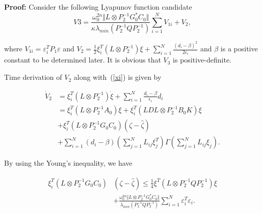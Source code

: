 \documentclass[english]{cccconf}
\begin{document}
\textbf{Proof:} Consider the following Lyapunov function candidate
\begin{equation}
  \label{p1}
  V{3}= \frac{\omega^{2n}_0 \Vert L \otimes P^{-1}_{2}G_{0}^{*}C_0 \Vert}{\kappa \lambda_{min}(P_{2}^{-1} Q P_{2}^{-1})} \sum_{i=1}^N V_{1i} + V_2,
\end{equation}

where $V_{1i}=\varepsilon^T_i P_1 \varepsilon$ and $V_2=\frac{1}{2} \xi^T_i ( L \otimes P^{-1}_2)\xi + \sum_{i=1}^N \frac{(d_i-\beta)^2}{2\epsilon_i}$ and $\beta$ is a positive constant to be determined later.
It is obvious that $V_3$ is positive-definite. 


Time derivation of $V_2$ along with~(\ref{xi}) is given by 

 
\begin{equation}
  \label{p3}
  \begin{aligned}
  \dot V_{2} &= \xi^T_i ( L \otimes P^{-1}_2)\dot \xi + \sum_{i=1}^N\frac{d_i-\beta}{\epsilon_i} \dot d_i \\
  &= \xi^T_i ( L \otimes P^{-1}_{2} A_{0}) \xi + \xi^T_i ( LDL \otimes P^{-1}_{2} B_{0} K) \xi \\& + \xi^T_i ( L \otimes P^{-1}_{2} G_{0} C_0) (\zeta - \hat \zeta) \\& + \sum_{i=1}^N(d_i-\beta)(\sum_{j=1}^N L_{ij} \xi_{j}^T)\Gamma(\sum_{j=1}^N L_{ij} \xi_{j}).
  \end{aligned}
\end{equation}

By using the Young's inequality\cite{Matrix}, we have

\begin{equation}
  \label{p4}
  \begin{aligned}
\xi^T_i ( L \otimes P^{-1}_{2} G_{0} C_0) &(\zeta - \hat \zeta) \le \frac{1}{4} \xi^T (L \otimes P_{2}^{-1} Q P_{2}^{-1}) \xi \\ &+ \frac{\omega^{2n}_0 \Vert L \otimes P^{-1}_{2}G_{0}^{*}C_0 \Vert}{ \lambda_{min}(P_{2}^{-1} Q P_{2}^{-1})} \sum_{i=1}^{N}\varepsilon_i^T \varepsilon_i.
  \end{aligned}
\end{equation}
\end{document}
